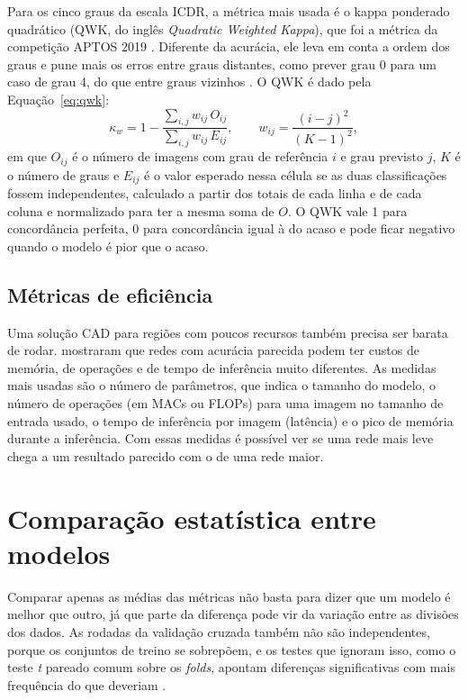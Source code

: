 Para os cinco graus da escala ICDR, a métrica mais usada é o kappa ponderado quadrático (QWK, do inglês \textit{Quadratic Weighted Kappa}), que foi a métrica da competição APTOS 2019 \cite{aptos2019}. Diferente da acurácia, ele leva em conta a ordem dos graus e pune mais os erros entre graus distantes, como prever grau 0 para um caso de grau 4, do que entre graus vizinhos \cite{cohen1968kappa,fleiss1973kappa}. O QWK é dado pela Equação~\ref{eq:qwk}:
\begin{equation}
	\label{eq:qwk}
	\kappa_w = 1 - \frac{\sum_{i,j} w_{ij}\, O_{ij}}{\sum_{i,j} w_{ij}\, E_{ij}}, \qquad w_{ij} = \frac{(i - j)^2}{(K - 1)^2},
\end{equation}
em que $O_{ij}$ é o número de imagens com grau de referência $i$ e grau previsto $j$, $K$ é o número de graus e $E_{ij}$ é o valor esperado nessa célula se as duas classificações fossem independentes, calculado a partir dos totais de cada linha e de cada coluna e normalizado para ter a mesma soma de $O$. O QWK vale 1 para concordância perfeita, 0 para concordância igual à do acaso e pode ficar negativo quando o modelo é pior que o acaso.

\subsection{Métricas de eficiência}
\label{sec:metricas-eficiencia}

Uma solução CAD para regiões com poucos recursos também precisa ser barata de rodar.  mostraram que redes com acurácia parecida podem ter custos de memória, de operações e de tempo de inferência muito diferentes. As medidas mais usadas são o número de parâmetros, que indica o tamanho do modelo, o número de operações (em MACs ou FLOPs) para uma imagem no tamanho de entrada usado, o tempo de inferência por imagem (latência) e o pico de memória durante a inferência. Com essas medidas é possível ver se uma rede mais leve chega a um resultado parecido com o de uma rede maior.

\section{Comparação estatística entre modelos}
\label{sec:estatistica}

Comparar apenas as médias das métricas não basta para dizer que um modelo é melhor que outro, já que parte da diferença pode vir da variação entre as divisões dos dados. As rodadas da validação cruzada também não são independentes, porque os conjuntos de treino se sobrepõem, e os testes que ignoram isso, como o teste \textit{t} pareado comum sobre os \textit{folds}, apontam diferenças significativas com mais frequência do que deveriam \cite{dietterich1998,nadeau2003inference}.

